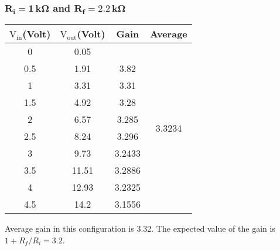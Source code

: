 \documentclass[12pt]{article}
\begin{document}
\subsubsection{$\mathbf{R_i = 1\, k \Omega}$ and $\mathbf{R_f = 2.2\, k \Omega}$}
\begin{table}[H]
	\centering
	\begin{tabular}{|c|c|c|c|}
		\hline
		$\mathrm{V_{in}}$(Volt) & $\mathrm{V_{out}}$(Volt) & Gain             & Average                            \\ \hline \hline
		0            & 0.05          &                  & \multirow{10}{*}{3.3234} 			 \\ \cline{1-3}
		0.5          & 1.91          & 3.82             &                                    \\ \cline{1-3}
		1            & 3.31          & 3.31             &                                    \\ \cline{1-3}
		1.5          & 4.92          & 3.28             &                                    \\ \cline{1-3}
		2            & 6.57          & 3.285            &                                    \\ \cline{1-3}
		2.5          & 8.24          & 3.296            &                                    \\ \cline{1-3}
		3            & 9.73          & 3.2433 			&                                    \\ \cline{1-3}
		3.5          & 11.51         & 3.2886 			&                                    \\ \cline{1-3}
		4            & 12.93         & 3.2325           &                                    \\ \cline{1-3}
		4.5          & 14.2          & 3.1556 			&                                    \\ \hline
	\end{tabular}
\end{table}
Average gain in this configuration is 3.32. The expected value of the gain is $ 1+ R_f/R_i = 3.2 $. 
\end{document}
